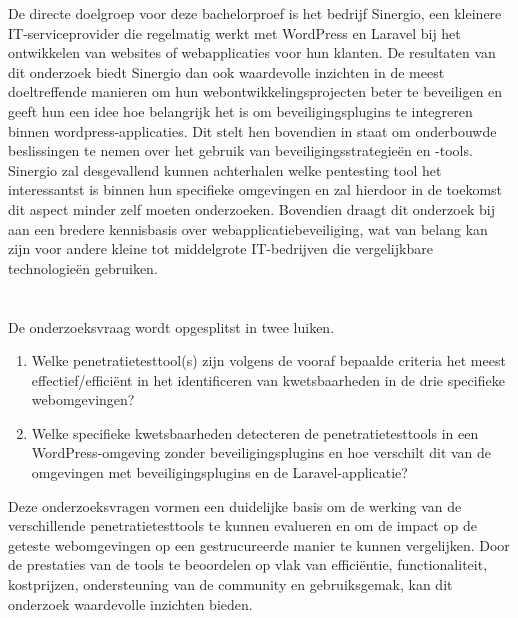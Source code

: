 De directe doelgroep voor deze bachelorproef is het bedrijf Sinergio, een kleinere IT-serviceprovider die regelmatig 
werkt met WordPress en Laravel bij het ontwikkelen van websites of webapplicaties voor hun klanten. De resultaten van dit 
onderzoek biedt Sinergio dan ook waardevolle inzichten in de meest doeltreffende manieren om hun webontwikkelingsprojecten beter 
te beveiligen en geeft hun een idee hoe belangrijk het is om beveiligingsplugins te integreren binnen wordpress-applicaties. 
Dit stelt hen bovendien in staat om onderbouwde beslissingen te nemen over het gebruik van 
beveiligingsstrategieën en -tools. Sinergio zal desgevallend kunnen achterhalen welke pentesting tool het interessantst is 
binnen hun specifieke omgevingen en zal hierdoor in de toekomst dit aspect minder zelf moeten onderzoeken.
Bovendien draagt dit onderzoek bij aan een bredere kennisbasis over webapplicatiebeveiliging, 
wat van belang kan zijn voor andere kleine tot middelgrote IT-bedrijven die vergelijkbare technologieën gebruiken.

\section{}%
\label{sec:onderzoeksvraag}
De onderzoeksvraag wordt opgesplitst in twee luiken.
\begin{enumerate}
  \item Welke penetratietesttool(s) zijn volgens de vooraf bepaalde criteria het meest effectief/efficiënt in het identificeren van kwetsbaarheden in de drie specifieke webomgevingen?
  \item Welke specifieke kwetsbaarheden detecteren de penetratietesttools in een WordPress-omgeving zonder beveiligingsplugins en hoe verschilt dit van de omgevingen met beveiligingsplugins en de Laravel-applicatie? 
\end{enumerate}
Deze onderzoeksvragen vormen een duidelijke basis om de werking van de verschillende penetratietesttools te kunnen evalueren 
en om de impact op de geteste webomgevingen op een gestrucureerde manier te kunnen vergelijken. Door de prestaties van de 
tools te beoordelen op vlak van efficiëntie, functionaliteit, kostprijzen, ondersteuning van de community en gebruiksgemak, 
kan dit onderzoek waardevolle inzichten bieden.

